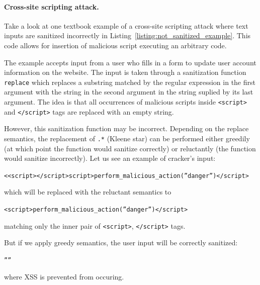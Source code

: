 \paragraph{Cross-site scripting attack.}
Take a look at one textbook example of a cross-site scripting attack where text inputs are sanitized incorrectly in Listing~\ref{listing:not_sanitized_example}.
This code allows for insertion of malicious script executing an arbitrary code.

The example accepts input from a user who fills in a form to update user account information on the website.
The input is taken through a sanitization function \texttt{replace} which replaces a substring matched by the regular expression in the first argument with the string in the second argument in the string suplied by its last argument.
The idea is that all occurrences of malicious scripts inside \texttt{<script>} and \texttt{</script>} tags are replaced with an empty string.

However, this sanitization function may be incorrect.
Depending on the replace semantics, the replacement of \texttt{.*} (Kleene star) can be performed either greedily (at which point the function would sanitize correctly) or reluctantly (the function would sanitize incorrectly).
Let us see an example of cracker's input:
\begin{center}
 \texttt{<<script></script>script>perform\_malicious\_action(''danger'')</script>}
\end{center}
which will be replaced with the reluctant semantics to
\begin{center}
 \texttt{<script>perform\_malicious\_action(''danger'')</script>}
\end{center}

matching only the inner pair of \texttt{<script>}, \texttt{</script>} tags.

But if we apply greedy semantics, the user input will be correctly sanitized:
\begin{center}
 \texttt{''''}
\end{center}
where XSS is prevented from occuring.

